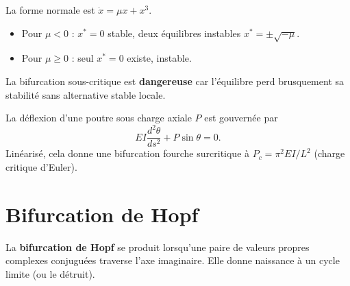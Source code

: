 \begin{theoreme}
La forme normale est $\dot{x} = \mu x + x^3$.
\begin{itemize}
    \item Pour $\mu < 0$ : $x^* = 0$ stable, deux \'equilibres instables
    $x^* = \pm\sqrt{-\mu}$.
    \item Pour $\mu \geq 0$ : seul $x^* = 0$ existe, instable.
\end{itemize}
La bifurcation sous-critique est \textbf{dangereuse} car l'\'equilibre perd
brusquement sa stabilit\'e sans alternative stable locale.
\end{theoreme}

\begin{center}
\end{center}

\begin{exemple}
La d\'eflexion d'une poutre sous charge axiale $P$ est gouvern\'ee par
\[
    EI\frac{d^2\theta}{ds^2} + P\sin\theta = 0.
\]
Lin\'earis\'e, cela donne une bifurcation fourche surcritique \`a
$P_c = \pi^2 EI / L^2$ (charge critique d'Euler).
\end{exemple}

\section{Bifurcation de Hopf}

\begin{definition}
La \textbf{bifurcation de Hopf} se produit lorsqu'une paire de valeurs
propres complexes conjugu\'ees traverse l'axe imaginaire. Elle donne naissance
\`a un cycle limite (ou le d\'etruit).
\end{definition}

